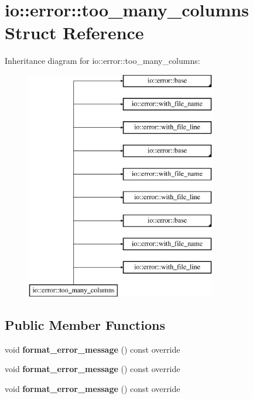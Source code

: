 \hypertarget{structio_1_1error_1_1too__many__columns}{}\section{io\+:\+:error\+:\+:too\+\_\+many\+\_\+columns Struct Reference}
\label{structio_1_1error_1_1too__many__columns}
Inheritance diagram for io\+:\+:error\+:\+:too\+\_\+many\+\_\+columns\+:\begin{figure}[H]
\begin{center}
\leavevmode
\includegraphics[height=10.000000cm]{d1/d2d/structio_1_1error_1_1too__many__columns}
\end{center}
\end{figure}
\subsection*{Public Member Functions}
\begin{DoxyCompactItemize}
\item 
\mbox{\label{structio_1_1error_1_1too__many__columns_afed8f8e98adc46965e649f0ea2484867}} 
void {\bfseries format\+\_\+error\+\_\+message} () const override
\item 
\mbox{\label{structio_1_1error_1_1too__many__columns_afed8f8e98adc46965e649f0ea2484867}} 
void {\bfseries format\+\_\+error\+\_\+message} () const override
\item 
\mbox{\label{structio_1_1error_1_1too__many__columns_afed8f8e98adc46965e649f0ea2484867}} 
void {\bfseries format\+\_\+error\+\_\+message} () const override
\end{DoxyCompactItemize}
